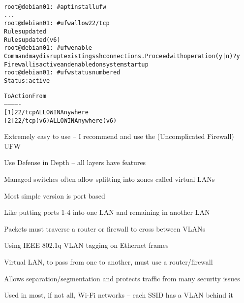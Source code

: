 \documentclass[Screen16to9,17pt]{foils}
\begin{document}

\begin{alltt}\small
root@debian01:~# apt install ufw
...
root@debian01:~# ufw allow 22/tcp
Rules updated
Rules updated (v6)
root@debian01:~# ufw enable
Command may disrupt existing ssh connections. Proceed with operation (y|n)? y
Firewall is active and enabled on system startup
root@debian01:~# ufw status numbered
Status: active

     To                         Action      From
     --                         ------      ----
[ 1] 22/tcp                     ALLOW IN    Anywhere
[ 2] 22/tcp (v6)                ALLOW IN    Anywhere (v6)
\end{alltt}

\begin{list2}
\item Extremely easy to use -- I recommend and use the (Uncomplicated Firewall) UFW
\end{list2}



\centerline{Use Defense in Depth -- all layers have features}






\begin{list1}
\item Managed switches often allow splitting into zones called virtual LANs
\item Most simple version is port based
\item Like putting ports 1-4 into one LAN and remaining in another LAN
\item Packets must traverse a router or firewall to cross between VLANs
\end{list1}



\begin{list1}
\item Using IEEE 802.1q  VLAN tagging on Ethernet frames
\item Virtual LAN, to pass from one to another, must use a router/firewall
\item Allows separation/segmentation and protects traffic from many security issues
\item Used in most, if not all, Wi-Fi networks -- each SSID has a VLAN behind it
\end{list1}
\end{document}
